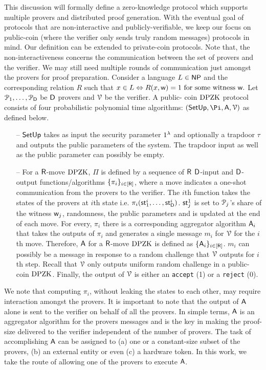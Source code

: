 This discussion will formally define a zero-knowledge protocol which supports multiple provers and distributed proof generation. With the eventual goal of protocols that are non-interactive  and publicly-verifiable,  we keep our focus on  public-coin (where the verifier only sends truly random messages) protocols in mind.  Our definition can be extended to private-coin protocols. Note that, the non-interactiveness concerns the communication between the set of provers and the verifier. We may still need multiple rounds of communication just amongst the provers for proof preparation.  Consider a language $L \in \mathsf{NP}$ and the corresponding relation $R$ such that
$
{x} \in L \Leftrightarrow R({x}, \mathsf{w})=1 \text{ for some witness } \mathsf{w}.
$
Let $\mathcal{P}_1, \ldots, \mathcal{P}_{\mathsf{D}}$ be $\mathsf{D}$ provers and $\mathcal{V}$ be the verifier.
A public- coin $\text{DPZK}$ protocol consists of four probabilistic polynomial time algorithms: $(\setup, \Pi, \Ag, \verifier)$ as defined below. 
\begin{itemize}
	\item[--] $\mathsf{SetUp}$ takes as input the security parameter $1^{\lambda}$ and optionally a trapdoor $\tau$ and outputs the public parameters of the system. The trapdoor input as well as the public parameter can possibly be empty.
	\item[--] For a $\mathsf{R}$-move $\text{DPZK}$, $\Pi$ is defined by a sequence of $\mathsf{R}$ $\mathsf{D}$-input and $\mathsf{D}$-output functions/algorithms   $\{\pi_i\}_{i \in [\mathsf{R}]}$, where a move indicates a one-shot communication from the provers to the verifier.  The $i$th function takes the states of the provers at $i$th state i.e. $\pi_i(\mathsf{st}^i_1, \ldots, \mathsf{st}^i_{\mathsf{D}})$. $\mathsf{st}^1_j$ is set to  $\mathcal{P}_j$'s share of the witness $\mathsf{w}_j$, randomness, the public parameters and is updated at the end of each move.  For every, $\pi_i$ there is a corresponding aggregator algorithm $\mathsf{A}_i$ that takes the outputs of $\pi_i$ and generates a single message  $m_i$ for $\mathcal{V}$ for the $i$th move. Therefore, $\mathsf{A}$ for a $\mathsf{R}$-move $\text{DPZK}$ is defined as $\{\mathsf{A}_i\}_{i \in [\mathsf{R}]}$.  $m_i$ can possibly be  a message in response to a random challenge that $\mathcal{V}$ outputs for $i$th step. Recall that $\mathcal{V}$ only outputs uniform random challenge in a public-coin $\text{DPZK}$. Finally, the output of $\mathcal{V}$ is either an {\tt accept} (1) or a {\tt reject} (0).
\end{itemize}
We note that computing $\pi_i$, without leaking the states to each other, may require interaction amongst the provers. It is important to note that the output of $\mathsf{A}$ alone is sent to the verifier on behalf of all the provers. In simple terms,  $\mathsf{A}$ is an aggregator algorithm for the provers messages and is the key in making the proof-size delivered to the verifier independent of the number of provers.  The task of accomplishing $\mathsf{A}$ can be assigned to (a) one or a constant-size subset of the provers, (b) an external entity or even (c) a hardware token.  In this work, we take the route of allowing one of the provers to execute $\mathsf{A}$.

